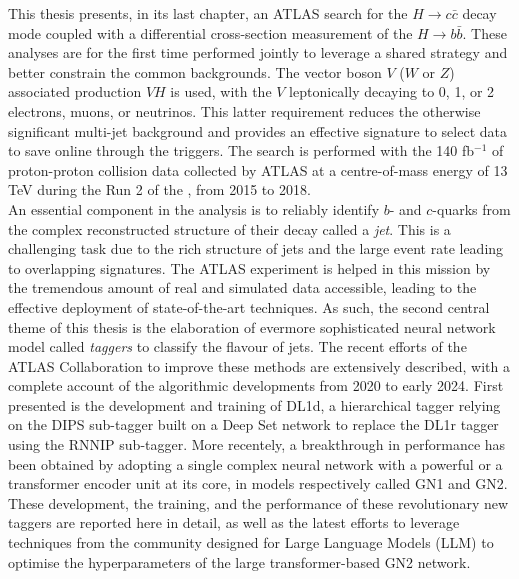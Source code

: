This thesis presents, in its last chapter, an ATLAS search for the $H \rightarrow c\bar{c}$ decay mode coupled with a differential cross-section measurement of the $H \rightarrow b\bar{b}$. These analyses are for the first time performed jointly to leverage a shared strategy and better constrain the common backgrounds. The vector boson $V$ ($W$ or $Z$) associated production $VH$ is used, with the $V$ leptonically decaying to 0, 1, or 2 electrons, muons, or neutrinos. This latter requirement reduces the otherwise significant multi-jet background and provides an effective signature to select data to save online through the triggers. The search is performed with the 140 fb$^{-1}$ of proton-proton collision data collected by ATLAS at a centre-of-mass energy of 13 TeV during the Run 2 of the , from 2015 to 2018. \\

An essential component in the analysis is to reliably identify $b$- and $c$-quarks from the complex reconstructed structure of their decay called a \textit{jet}. This is a challenging task due to the rich structure of jets and the large event rate leading to overlapping signatures. The ATLAS experiment is helped in this mission by the tremendous amount of real and simulated data accessible, leading to the effective deployment of state-of-the-art  techniques. As such, the second central theme of this thesis is the elaboration of evermore sophisticated neural network model called \textit{taggers} to classify the flavour of jets. The recent efforts of the ATLAS Collaboration to improve these methods are extensively described, with a complete account of the algorithmic developments from 2020 to early 2024. First presented is the development and training of DL1d, a hierarchical tagger relying on the DIPS sub-tagger built on a Deep Set network to replace the DL1r tagger using the RNNIP sub-tagger. More recentely, a breakthrough in performance has been obtained by adopting a single complex neural network with a powerful  or a transformer encoder unit at its core, in models respectively called GN1 and GN2. These development, the training, and the performance of these revolutionary new taggers are reported here in detail, as well as the latest efforts to leverage techniques from the  community designed for Large Language Models (LLM) to optimise the hyperparameters of the large transformer-based GN2 network. \\

